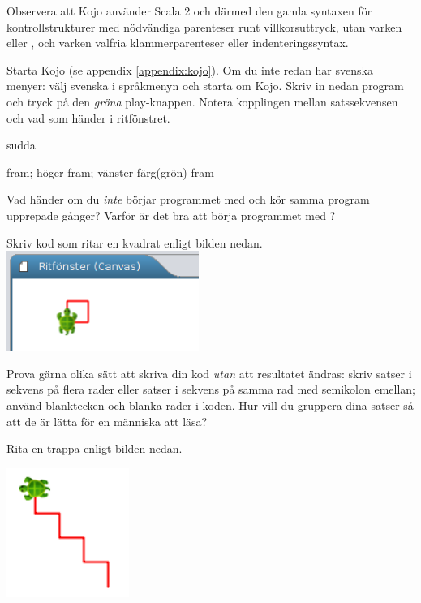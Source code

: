 Observera att Kojo använder Scala 2 och därmed den gamla syntaxen för kontrollstrukturer med nödvändiga parenteser runt villkorsuttryck, utan varken  eller , och varken valfria klammerparenteser eller indenteringssyntax. 

Starta Kojo (se appendix \ref{appendix:kojo}). Om du inte redan har svenska menyer: välj svenska i språkmenyn och starta om Kojo.  Skriv in nedan program och tryck på den \emph{gröna} play-knappen. Notera kopplingen mellan satssekvensen och vad som händer i ritfönstret.

\begin{Code}
sudda

fram; höger
fram; vänster
färg(grön)
fram
\end{Code}
\noindent


\Subtask Vad händer om du \emph{inte} börjar programmet med  och kör samma program upprepade gånger? Varför är det bra att börja programmet med ?

\Subtask Skriv kod som ritar en kvadrat enligt bilden nedan.
\vspace{1em}\\\includegraphics[width=0.47\textwidth]{../img/kojo/kvadrat}

\noindent Prova gärna olika sätt att skriva din kod \emph{utan} att resultatet ändras: skriv satser i sekvens på flera rader eller satser i sekvens på samma rad med semikolon emellan; använd blanktecken och blanka rader i koden. Hur vill du gruppera dina satser så att de är lätta för en människa att läsa?


\Subtask Rita en trappa enligt bilden nedan.

\includegraphics[width=0.3\textwidth]{../img/kojo/stairs}


